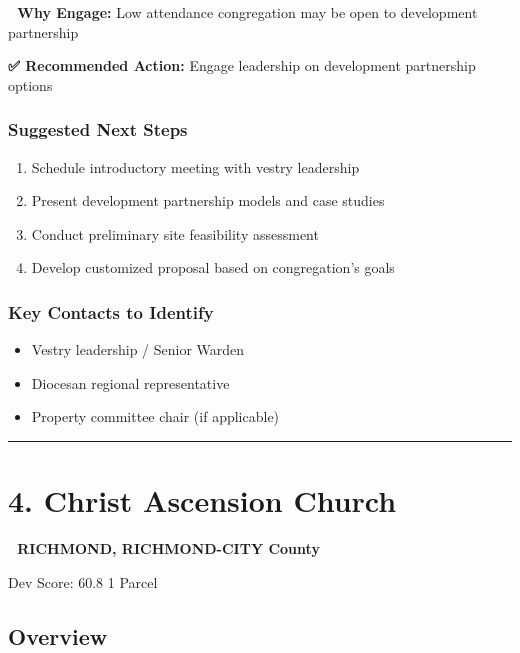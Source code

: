 \documentclass[
  letterpaper,
  DIV=11,
  numbers=noendperiod,
  oneside]{scrreprt}
\providecommand{\tightlist}{%
  \setlength{\itemsep}{0pt}\setlength{\parskip}{0pt}}
\begin{document}
\textbf{🎯 Why Engage:} Low attendance congregation may be open to
development partnership

\textbf{✅ Recommended Action:} Engage leadership on development
partnership options

\subsubsection{Suggested Next Steps}\label{suggested-next-steps-2}

\begin{enumerate}
\def\labelenumi{\arabic{enumi}.}
\tightlist
\item
  Schedule introductory meeting with vestry leadership
\item
  Present development partnership models and case studies
\item
  Conduct preliminary site feasibility assessment
\item
  Develop customized proposal based on congregation's goals
\end{enumerate}

\subsubsection{Key Contacts to
Identify}\label{key-contacts-to-identify-2}

\begin{itemize}
\tightlist
\item[$\square$]
  Vestry leadership / Senior Warden
\item[$\square$]
  Diocesan regional representative
\item[$\square$]
  Property committee chair (if applicable)
\end{itemize}

\begin{center}\rule{0.5\linewidth}{0.5pt}\end{center}

\section*{4. Christ Ascension Church}\label{christ-ascension-church}


\textbf{📍 RICHMOND, RICHMOND-CITY County}

{Dev Score: 60.8} {1 Parcel}

\subsection{Overview}
\end{document}
